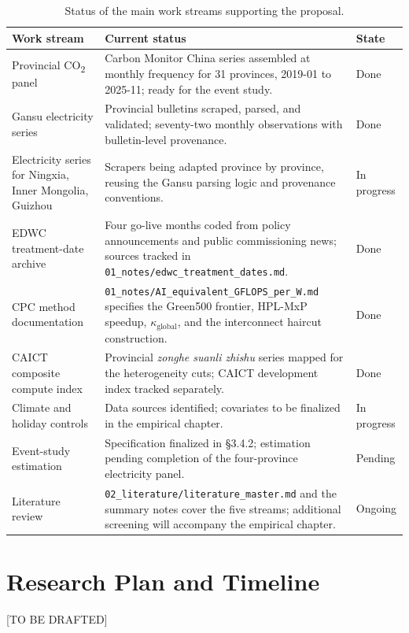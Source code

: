 \documentclass[12pt,a4paper]{article}
\begin{document}
\begin{table}[h]
\centering
\small
\begin{tabular}{p{4.5cm} p{7.5cm} p{2cm}}
\toprule
\textbf{Work stream} & \textbf{Current status} & \textbf{State} \\
\midrule
Provincial CO\textsubscript{2} panel &
Carbon Monitor China series assembled at monthly frequency for 31
provinces, 2019-01 to 2025-11; ready for the event study. & Done \\
\addlinespace
Gansu electricity series &
Provincial bulletins scraped, parsed, and validated; seventy-two
monthly observations with bulletin-level provenance. & Done \\
\addlinespace
Electricity series for Ningxia, Inner Mongolia, Guizhou &
Scrapers being adapted province by province, reusing the Gansu
parsing logic and provenance conventions. & In progress \\
\addlinespace
EDWC treatment-date archive &
Four go-live months coded from policy announcements and public
commissioning news; sources tracked in
\texttt{01\_notes/edwc\_treatment\_dates.md}. & Done \\
\addlinespace
CPC method documentation &
\texttt{01\_notes/AI\_equivalent\_GFLOPS\_per\_W.md} specifies the
Green500 frontier, HPL-MxP speedup, $\kappa_{\text{global}}$, and
the interconnect haircut construction. & Done \\
\addlinespace
CAICT composite compute index &
Provincial \emph{zonghe suanli zhishu} series mapped for the
heterogeneity cuts; CAICT development index tracked separately. & Done \\
\addlinespace
Climate and holiday controls &
Data sources identified; covariates to be finalized in the empirical
chapter. & In progress \\
\addlinespace
Event-study estimation &
Specification finalized in §3.4.2; estimation pending completion of
the four-province electricity panel. & Pending \\
\addlinespace
Literature review &
\texttt{02\_literature/literature\_master.md} and the summary notes
cover the five streams; additional screening will accompany the
empirical chapter. & Ongoing \\
\bottomrule
\end{tabular}
\caption{Status of the main work streams supporting the proposal.}
\label{tab:progress}
\end{table}


%

\section{Research Plan and Timeline}

[TO BE DRAFTED]





\end{document}
